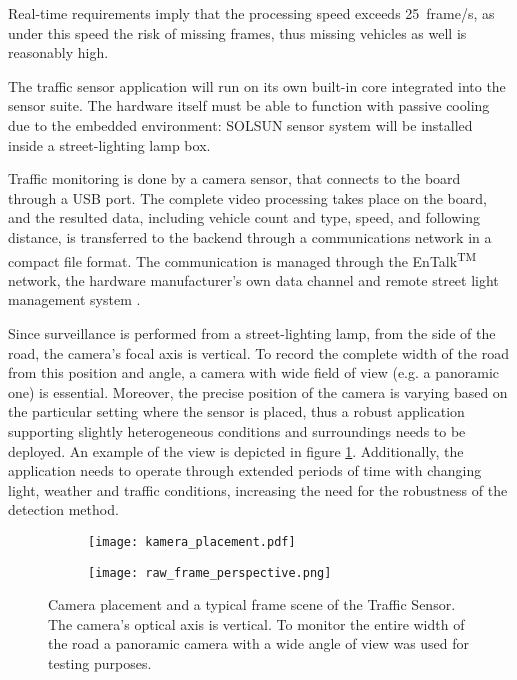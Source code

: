 Real-time requirements imply that the processing speed exceeds \SI{25}{frame/s}, as under this speed the risk of missing frames, thus missing vehicles as well is reasonably high.

The traffic sensor application will run on its own built-in core integrated into the sensor suite.
The hardware itself must be able to function with passive cooling due to the embedded environment: SOLSUN sensor system will be installed inside a street-lighting lamp box.

Traffic monitoring is done by a camera sensor, that connects to the board through a USB port.
The complete video processing takes place on the board, and the resulted data, including vehicle count and type, speed, and following distance, is transferred to the backend through a communications network in a compact file format.
The communication is managed through the EnTalk\textsuperscript{TM} network, the hardware manufacturer's own data channel and remote street light management system \cite{EnTalk}.

Since surveillance is performed from a street-lighting lamp, from the side of the road, the camera's focal axis is vertical.
To record the complete width of the road from this position and angle, a camera with wide field of view (e.g. a panoramic one) is essential.
Moreover, the precise position of the camera is varying based on the particular setting where the sensor is placed, thus a robust application supporting slightly heterogeneous conditions and surroundings needs to be deployed. 
An example of the view is depicted in figure \ref{fig:camera_position}.
Additionally, the application needs to operate through extended periods of time with changing light, weather and traffic conditions, increasing the need for the robustness of the detection method.

\begin{figure}
	\centering
	\begin{subfigure}[b]{.5\textwidth}
		\centering
		\texttt{[image: kamera\_placement.pdf]}
	\end{subfigure}%
	\begin{subfigure}[b]{.5\textwidth}
		\centering
		\texttt{[image: raw\_frame\_perspective.png]}
	\end{subfigure}
	\caption{Camera placement and a typical frame scene of the Traffic Sensor. The camera's optical axis is vertical. To monitor the entire width of the road a panoramic camera with a wide angle of view was used for testing purposes.}
	\label{fig:camera_position}
\end{figure}

